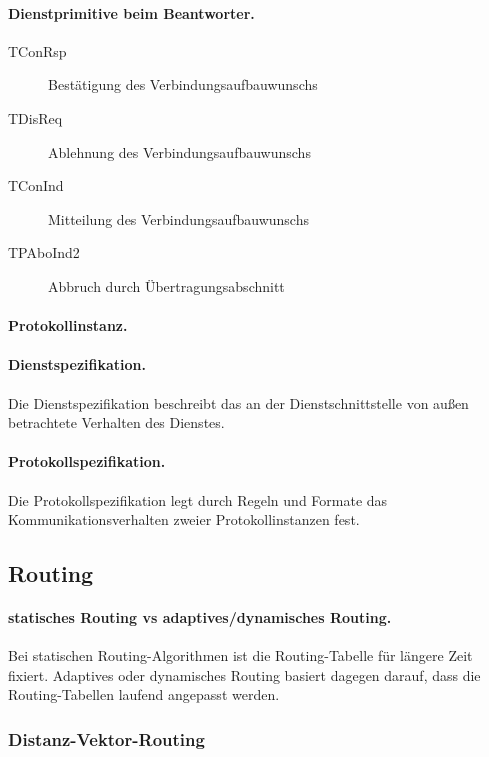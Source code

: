 \documentclass[]{scrartcl}
\begin{document}
\paragraph{Dienstprimitive beim Beantworter.}

\begin{description}
\item[TConRsp] Best\"atigung des Verbindungsaufbauwunschs
\item[TDisReq] Ablehnung des Verbindungsaufbauwunschs
\item[TConInd] Mitteilung des Verbindungsaufbauwunschs
\item[TPAboInd2] Abbruch durch \"Ubertragungsabschnitt
\end{description}

\paragraph{Protokollinstanz. }

\paragraph{Dienstspezifikation.} Die Dienstspezifikation beschreibt das an der Dienstschnittstelle von au{\ss}en betrachtete Verhalten des Dienstes.

\paragraph{Protokollspezifikation.} Die Protokollspezifikation legt durch Regeln und Formate das Kommunikationsverhalten zweier Protokollinstanzen fest.






\subsection{Routing}

\paragraph{statisches Routing vs adaptives/dynamisches Routing.} Bei statischen Routing-Algorithmen ist die Routing-Tabelle f\"ur l\"angere Zeit fixiert. Adaptives oder dynamisches Routing basiert dagegen darauf, dass die Routing-Tabellen laufend angepasst werden.

\subsubsection{Distanz-Vektor-Routing}
\end{document}
